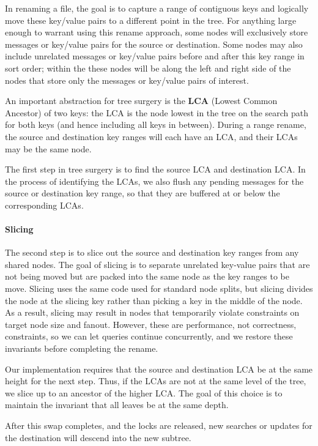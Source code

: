 In renaming a file, the goal is to capture a range of contiguous keys and
logically move these key/value pairs to a different point in the tree.
For anything large enough to warrant using this rename approach,
some \bet nodes will exclusively store messages or key/value pairs
for the source or destination.
Some nodes may also include unrelated messages or key/value pairs
before and after this key range in sort order;
within the \bet these nodes will be along the left and right side of the nodes
that store only the messages or key/value pairs of interest.

An important abstraction for tree surgery is the \textbf{LCA}
(Lowest Common Ancestor) of two keys: the LCA is the \bet node lowest in the
tree on the search path for both keys (and hence including all keys in between).
During a range rename, the source and destination key ranges will each have an
LCA, and their LCAs may be the same node.

The first step in tree surgery is to find the source LCA and destination LCA.
In the process of identifying the LCAs, we also flush any pending messages for
the source or destination key range, so that they are buffered at or below the
corresponding LCAs.

\paragraph{Slicing}  The second step is to slice out the source and destination
key ranges from any shared nodes.
The goal of slicing is to separate unrelated key-value pairs that are not being
moved but are packed into the same \bet node as the key ranges to be move.
Slicing uses the same  code used for standard \bet node splits, but slicing
divides the node at the slicing key rather than picking a key in the middle of
the node.
As a result, slicing may result in nodes that temporarily violate constraints on
target node size and fanout.
However, these are performance, not correctness, constraints, so we can let
queries continue concurrently, and we restore these invariants before completing
the rename.

Our implementation requires that the source and destination LCA be at the same
height for the next step.
Thus, if the LCAs are not at the same level of the tree, we slice up to an
ancestor of the higher LCA.
The goal of this choice is to maintain the invariant that all \bet leaves be
at the same depth.

After this swap completes, and the locks are released,
new searches or updates for the destination will descend into the new subtree.

